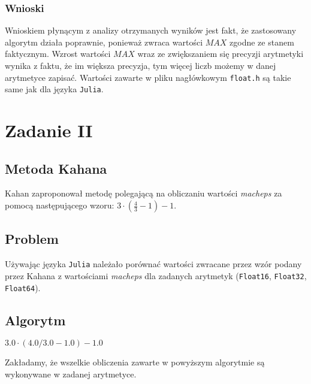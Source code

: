 \documentclass{article}
\begin{document}
\subsubsection{Wnioski}
Wnioskiem płynącym z analizy otrzymanych wyników jest fakt, że zastosowany algorytm działa poprawnie, ponieważ zwraca wartości $MAX$ zgodne ze stanem faktycznym. Wzrost wartości $MAX$ wraz ze zwiększaniem się precyzji arytmetyki wynika z faktu, że im większa precyzja, tym więcej liczb możemy w danej arytmetyce zapisać. Wartości zawarte w pliku nagłówkowym \texttt{float.h} są takie same jak dla języka \texttt{Julia}.

\section{Zadanie II}
\subsection{Metoda Kahana}
Kahan zaproponował metodę polegającą na obliczaniu wartości \textit{macheps} za pomocą następującego wzoru: $3 \cdot (\frac{4}{3} - 1) - 1 $.

\subsection{Problem}
Używając języka \texttt{Julia} należało porównać wartości zwracane przez wzór podany przez Kahana z wartościami \textit{macheps} dla zadanych arytmetyk (\texttt{Float16}, \texttt{Float32}, \texttt{Float64}).

\subsection{Algorytm}
\begin{algorithm}
    \begin{algorithmic}[1]
            \State \Return $3.0 \cdot (4.0/3.0 - 1.0) - 1.0$
        \EndFunction
    \end{algorithmic}
\end{algorithm}
Zakładamy, że wszelkie obliczenia zawarte w powyższym algorytmie są wykonywane w zadanej arytmetyce.
\end{document}
